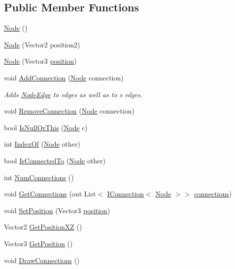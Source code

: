 \subsection*{Public Member Functions}
\begin{DoxyCompactItemize}
\item 
\mbox{\hyperlink{class_node_a989164b636cfeff98b4df9833976f4f5}{Node}} ()
\item 
\mbox{\hyperlink{class_node_a653c96cdaab99419a8c1d8d80be10b80}{Node}} (Vector2 position2)
\item 
\mbox{\hyperlink{class_node_a188e8794e019e1dd2fcfa84af795c06d}{Node}} (Vector3 \mbox{\hyperlink{class_node_a315059cd3874b8ca61426a4e1bd097a7}{position}})
\item 
void \mbox{\hyperlink{class_node_adaf109cc39cf2444181ea55985767cee}{Add\+Connection}} (\mbox{\hyperlink{class_node}{Node}} connection)
\begin{DoxyCompactList}\small\item\em Adds \mbox{\hyperlink{class_node_edge}{Node\+Edge}} to edges as well as to \textquotesingle{}s edges. \end{DoxyCompactList}\item 
void \mbox{\hyperlink{class_node_ac11a8a128533ef77b42e97d883ab0825}{Remove\+Connection}} (\mbox{\hyperlink{class_node}{Node}} connection)
\item 
bool \mbox{\hyperlink{class_node_a60543d6f014ce3e5d201108949bec386}{Is\+Null\+Or\+This}} (\mbox{\hyperlink{class_node}{Node}} c)
\item 
int \mbox{\hyperlink{class_node_adfa9ae31ba9f758335618f4928d9d4a0}{Index\+Of}} (\mbox{\hyperlink{class_node}{Node}} other)
\item 
bool \mbox{\hyperlink{class_node_acf505ea93da66cff664d7195d64c4a5b}{Is\+Connected\+To}} (\mbox{\hyperlink{class_node}{Node}} other)
\item 
int \mbox{\hyperlink{class_node_a229ce68ffe988dbfd45c05b7e7cbdf2d}{Num\+Connections}} ()
\item 
void \mbox{\hyperlink{class_node_a0a14a3bf53ab9b4939fa6518d1fa4278}{Get\+Connections}} (out List$<$ \mbox{\hyperlink{interface_i_connection}{I\+Connection}}$<$ \mbox{\hyperlink{class_node}{Node}} $>$$>$ \mbox{\hyperlink{class_node_a1d236f5a6dd9111a6ed9f2ebbdea57ac}{connections}})
\item 
void \mbox{\hyperlink{class_node_a42ff8a164e2432ceda0f17ab88fa47e1}{Set\+Position}} (Vector3 \mbox{\hyperlink{class_node_a315059cd3874b8ca61426a4e1bd097a7}{position}})
\item 
Vector2 \mbox{\hyperlink{class_node_a1173e5e173312924b2d0d399bf18e246}{Get\+Position\+XZ}} ()
\item 
Vector3 \mbox{\hyperlink{class_node_aba752b203dcf1360d6a9ef80deabd98e}{Get\+Position}} ()
\item 
void \mbox{\hyperlink{class_node_ada2f9aee327ffd50e46684303411b2a8}{Draw\+Connections}} ()
\end{DoxyCompactItemize}
